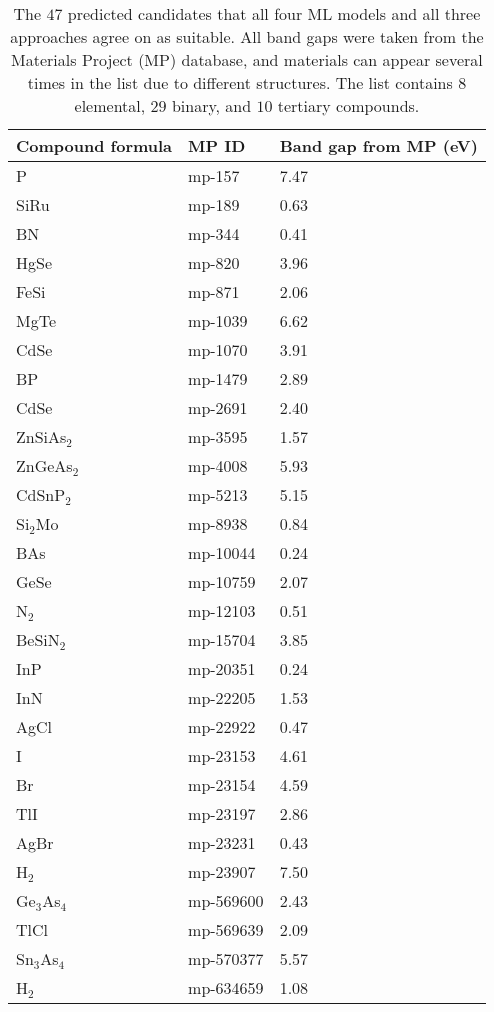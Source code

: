 \begin{center}
\begin{longtable}{M{3.5cm} M{6.5cm} M{2.0cm}}
\caption{The $47$ predicted candidates that all four ML models and all three approaches agree on as suitable. All band gaps were taken from the Materials Project (MP) database, and materials can appear several times in the list due to different structures. The list contains $8$ elemental, $29$ binary, and $10$ tertiary compounds.}
\label{tab:04-probability-candidates}  
\\ \hline
Compound formula & MP ID & Band gap from MP (eV) \\
\hline
  P & mp-157 & 7.47\\
  SiRu & mp-189 & 0.63\\
  BN & mp-344 & 0.41\\
  HgSe & mp-820 & 3.96\\
  FeSi & mp-871 & 2.06\\
  MgTe & mp-1039 & 6.62\\
  CdSe & mp-1070 & 3.91\\
  BP & mp-1479 & 2.89\\
  CdSe & mp-2691 & 2.40\\
  ZnSiAs$_2$ & mp-3595 & 1.57\\
  ZnGeAs$_2$ & mp-4008 & 5.93\\
  CdSnP$_2$ & mp-5213 & 5.15\\
  Si$_2$Mo & mp-8938 & 0.84\\
  BAs & mp-10044 & 0.24\\
  GeSe & mp-10759 & 2.07\\
  N$_2$ & mp-12103 & 0.51\\
  BeSiN$_2$ & mp-15704 & 3.85\\
  InP & mp-20351 & 0.24\\
  InN & mp-22205 & 1.53\\
  AgCl & mp-22922 & 0.47\\
  I & mp-23153 & 4.61\\
  Br & mp-23154 & 4.59\\
  TlI & mp-23197 & 2.86\\
  AgBr & mp-23231 & 0.43\\
  H$_2$ & mp-23907 & 7.50\\
  Ge$_3$As$_4$ & mp-569600 & 2.43\\
  TlCl & mp-569639 & 2.09\\
  Sn$_3$As$_4$ & mp-570377 & 5.57\\
  H$_2$ & mp-634659 & 1.08\\

\end{longtable}
\end{center}
